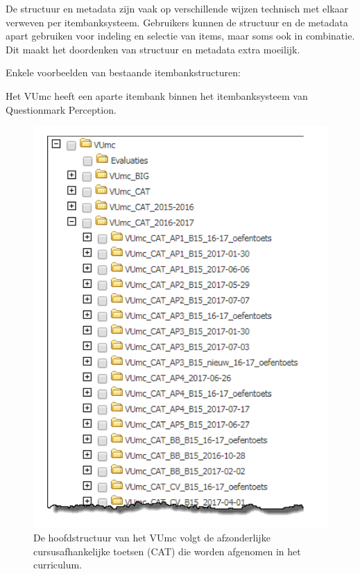 \documentclass[
]{book}
\begin{document}
De structuur en metadata zijn vaak op verschillende wijzen technisch met elkaar verweven per itembanksysteem. Gebruikers kunnen de structuur en de metadata apart gebruiken voor indeling en selectie van items, maar soms ook in combinatie. Dit maakt het doordenken van structuur en metadata extra moeilijk.

Enkele voorbeelden van bestaande itembankstructuren:

Het VUmc heeft een aparte itembank binnen het itembanksysteem van Questionmark Perception.

\begin{figure}
\includegraphics[width=0.6\linewidth]{images/fig4} \caption{De hoofdstructuur van het VUmc volgt de afzonderlijke cursusafhankelijke toetsen (CAT) die worden afgenomen in het curriculum.}\label{fig:unnamed-chunk-2}
\end{figure}
\end{document}
